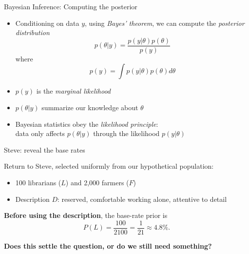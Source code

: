 \documentclass[10pt]{beamer}
\begin{document}
\begin{frame}{Bayesian Inference: Computing the posterior}
  \begin{itemize}
  \item Conditioning on data $y$, using \emph{Bayes' theorem}, we can compute the \emph{posterior distribution}
  \[
  p(\theta|y) = \frac{p(y|\theta) p(\theta)}{p(y)}
  \]
  where
  \[
  p(y) = \int p(y|\theta) p(\theta) d\theta
  \]
  \pause
  \item $p(y)$ is the \emph{marginal likelihood}
  \pause
  \item $p(\theta|y)$ summarize our knowledge about $\theta$
  \pause
  \item Bayesian statistics obey the \emph{likelihood principle}: \\ data only affects $p(\theta|y)$ through the likelihood $p(y|\theta)$
  \end{itemize}
\end{frame}


\begin{frame}{Steve: reveal the base rates}

  Return to Steve, selected uniformly from our hypothetical population:

  \begin{itemize}
  \item 100 librarians ($L$) and 2,000 farmers ($F$)
  \item Description $D$: reserved, comfortable working alone, attentive
    to detail
  \end{itemize}

  \textbf{Before using the description}, the base-rate prior is
  \[
    P(L)=\frac{100}{2100}=\frac{1}{21}\approx4.8\%.
  \]

  \textbf{Does this settle the question, or do we still need something?}


\end{frame}
\end{document}
